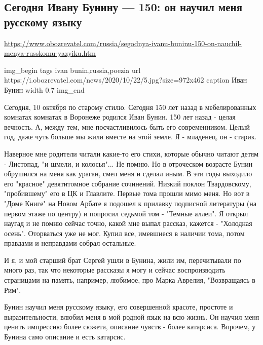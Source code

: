 
 

\subsection{Сегодня Ивану Бунину --- 150: он научил меня русскому языку}
\label{sec:22_10_2020.news.ua.obozreval.1.ivan_bunin_150}

\url{https://www.obozrevatel.com/russia/segodnya-ivanu-buninu-150-on-nauchil-menya-russkomu-yazyiku.htm}

\ifcmt
img_begin 
	tags ivan bunin,russia,poezia
	url https://i.obozrevatel.com/news/2020/10/22/5.jpg?size=972x462
	caption Иван Бунин
	width 0.7
img_end
\fi

Сегодня, 10 октября по старому стилю. Сегодня 150 лет назад в мебелированных
комнатах комнатах в Воронеже родился Иван Бунин. 150 лет назад - целая
вечность. А, между тем, мне посчастливилось быть его современником. Целый год,
даже чуть больше мы жили вместе на этой земле. Я - младенец, он - старик.

Наверное мне родители читали какие-то его стихи, которые обычно читают детям -
Листопад, "и шмели, и колосья"... Не помню. Но в отроческом возрасте Бунин
обрушился на меня как ураган, смел меня и сделал иным. В эти годы выходило его
"красное" девятитомное собрание сочинений. Низкий поклон Твардовскому,
"пробившему" его в ЦК и Главлите. Первые тома прошли мимо меня. Но вот в "Доме
Книге" на Новом Арбате я подошел к прилавку подписной литературы (на первом
этаже по центру) и попросил седьмой том - "Темные аллеи". Я открыл наугад и не
помню сейчас точно, какой мне выпал рассказ, кажется - "Холодная осень".
Оторваться уже не мог. Купил все, имевшиеся в наличии тома, потом правдами и
неправдами собрал остальные.

И я, и мой старший брат Сергей ушли в Бунина, жили им, перечитывали по много
раз, так что некоторые рассказы я могу и сейчас воспроизводить страницами на
память, например, любимое, про Марка Аврелия, "Возвращаясь в Рим".

Бунин научил меня русскому языку, его совершенной красоте, простоте и
выразительности, влюбил меня в мой родной язык на всю жизнь. Он научил меня
ценить импрессию более сюжета, описание чувств - более катарсиса. Впрочем, у
Бунина само описание и есть катарсис.


